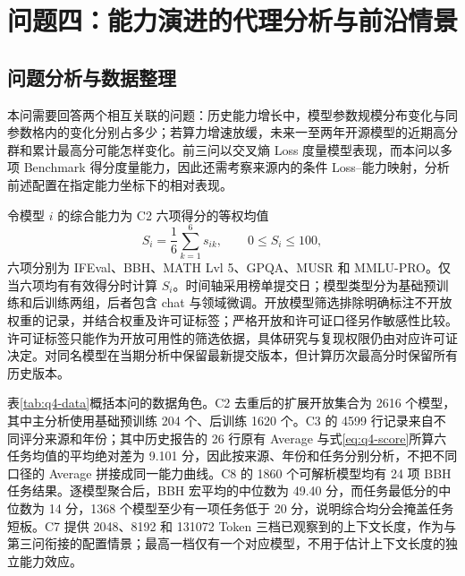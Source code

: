 \setcounter{section}{6}
\section{问题四：能力演进的代理分析与前沿情景}
\label{sec:q4}
\setcounter{equation}{0}
\setcounter{figure}{0}
\setcounter{table}{0}

\subsection{问题分析与数据整理}

本问需要回答两个相互关联的问题：历史能力增长中，模型参数规模分布变化与同参数格内的变化分别占多少；若算力增速放缓，未来一至两年开源模型的近期高分群和累计最高分可能怎样变化。前三问以交叉熵 Loss 度量模型表现，而本问以多项 Benchmark 得分度量能力，因此还需考察来源内的条件 Loss--能力映射\cite{gadre2024,observational2024}，分析前述配置在指定能力坐标下的相对表现。

令模型 $i$ 的综合能力为 C2 六项得分的等权均值
\begin{equation}
 S_i=\frac{1}{6}\sum_{k=1}^{6}s_{ik},\qquad 0\leq S_i\leq100,
 \label{eq:q4-score}
\end{equation}
六项分别为 IFEval\cite{ifeval2023}、BBH\cite{bbh2023}、MATH Lvl 5\cite{math2021}、GPQA\cite{gpqa2024}、MUSR\cite{musr2024} 和 MMLU-PRO\cite{mmlupro2024}。仅当六项均有有效得分时计算 $S_i$。时间轴采用榜单提交日；模型类型分为基础预训练和后训练两组，后者包含 chat 与领域微调。开放模型筛选排除明确标注不开放权重的记录，并结合权重及许可证标签；严格开放和许可证口径另作敏感性比较。许可证标签只能作为开放可用性的筛选依据，具体研究与复现权限仍由对应许可证决定。对同名模型在当期分析中保留最新提交版本，但计算历次最高分时保留所有历史版本。

表\ref{tab:q4-data}概括本问的数据角色。C2 去重后的扩展开放集合为 2616 个模型，其中主分析使用基础预训练 204 个、后训练 1620 个。C3 的 4599 行记录来自不同评分来源和年份；其中历史报告的 26 行原有 Average 与式\eqref{eq:q4-score}所算六任务均值的平均绝对差为 9.101 分，因此按来源、年份和任务分别分析，不把不同口径的 Average 拼接成同一能力曲线。C8 的 1860 个可解析模型均有 24 项 BBH 任务结果。逐模型聚合后，BBH 宏平均的中位数为 49.40 分，而任务最低分的中位数为 14 分，1368 个模型至少有一项任务低于 20 分，说明综合均分会掩盖任务短板。C7 提供 2048、8192 和 131072 Token 三档已观察到的上下文长度，作为与第三问衔接的配置情景；最高一档仅有一个对应模型，不用于估计上下文长度的独立能力效应。

